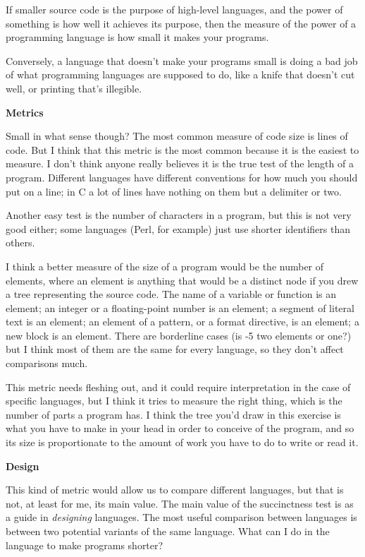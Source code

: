 If smaller source code is the purpose of high-level languages, and the
power of something is how well it achieves its purpose, then the measure
of the power of a programming language is how small it makes your
programs.

Conversely, a language that doesn't make your programs small is doing a
bad job of what programming languages are supposed to do, like a knife
that doesn't cut well, or printing that's illegible.

\textbf{Metrics}

Small in what sense though? The most common measure of code size is
lines of code. But I think that this metric is the most common because
it is the easiest to measure. I don't think anyone really believes it is
the true test of the length of a program. Different languages have
different conventions for how much you should put on a line; in C a lot
of lines have nothing on them but a delimiter or two.

Another easy test is the number of characters in a program, but this is
not very good either; some languages (Perl, for example) just use
shorter identifiers than others.

I think a better measure of the size of a program would be the number of
elements, where an element is anything that would be a distinct node if
you drew a tree representing the source code. The name of a variable or
function is an element; an integer or a floating-point number is an
element; a segment of literal text is an element; an element of a
pattern, or a format directive, is an element; a new block is an
element. There are borderline cases (is -5 two elements or one?) but I
think most of them are the same for every language, so they don't affect
comparisons much.

This metric needs fleshing out, and it could require interpretation in
the case of specific languages, but I think it tries to measure the
right thing, which is the number of parts a program has. I think the
tree you'd draw in this exercise is what you have to make in your head
in order to conceive of the program, and so its size is proportionate to
the amount of work you have to do to write or read it.

\textbf{Design}

This kind of metric would allow us to compare different languages, but
that is not, at least for me, its main value. The main value of the
succinctness test is as a guide in \emph{designing} languages. The most
useful comparison between languages is between two potential variants of
the same language. What can I do in the language to make programs
shorter?

